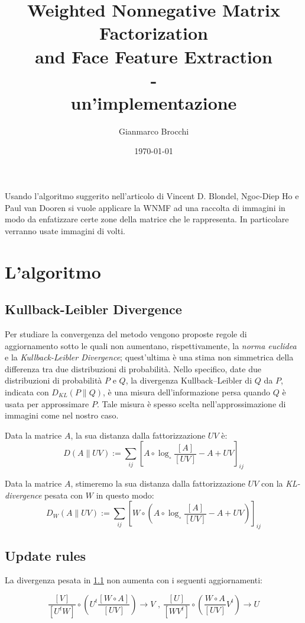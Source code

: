 \documentclass[a4paper]{article} %
\author{Gianmarco Brocchi}
\title{Weighted Nonnegative Matrix Factorization \\
and Face Feature Extraction \\ - \\ un'implementazione}
\date{\today}
\begin{document}
\maketitle

Usando l'algoritmo suggerito nell'articolo di Vincent D. Blondel, Ngoc-Diep Ho e  Paul van Dooren si vuole applicare la WNMF ad una raccolta di immagini in modo da enfatizzare certe zone della matrice che le rappresenta. In particolare verranno usate immagini di volti.

\section{L'algoritmo}

\subsection{Kullback-Leibler Divergence}\label{KL-div}
Per studiare la convergenza del metodo vengono proposte regole di aggiornamento sotto le quali non aumentano, rispettivamente, la \emph{norma euclidea} e la \emph{Kullback-Leibler Divergence}; quest'ultima è una stima non simmetrica della differenza tra due distribuzioni di probabilità. Nello specifico, date due distribuzioni di probabilità $P$ e $Q$, la divergenza Kullback–Leibler di $Q$ da $P$, indicata con $D_{KL}(P \lVert Q)$, è una misura dell'informazione persa quando $Q$ è usata per approssimare $P$. Tale misura è spesso scelta nell'approssimazione di immagini come nel nostro caso.

Data la matrice $A$, la sua distanza dalla fattorizzazione $UV$ è:
\[ D(A \lVert UV) := \sum_{ij} \left[ A \circ \log_{\circ} \frac{[A]}{[UV]} - A + UV \right]_{ij} \]

Data la matrice $A$, stimeremo la sua distanza dalla fattorizzazione $UV$ con la \emph{KL-divergence} pesata con $W$ in questo modo:
\[ D_W(A \lVert UV) := \sum_{ij} \left[ W \circ \left( A \circ \log_{\circ} \frac{[A]}{[UV]} - A + UV \right) \right]_{ij} \]

\subsection{Update rules}
La divergenza pesata in \ref{KL-div} non aumenta con i seguenti aggiornamenti:

\[ \frac{[V]}{[U^tW]} \circ \left( U^t \frac{[W \circ A]}{[UV]} \right) \rightarrow V \text{ , } \frac{[U]}{[WV^t]} \circ \left( \frac{W \circ A}{[UV]}V^t \right) \rightarrow U \]
\end{document}
